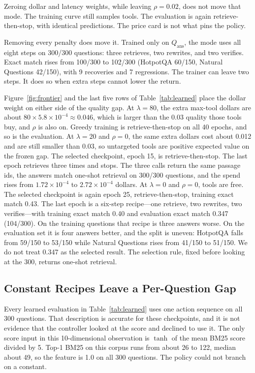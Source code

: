 \documentclass[letterpaper]{article} %
\begin{document}
Zeroing dollar and latency weights, while leaving \(\rho{=}0.02\), does not move that mode. The training curve still samples tools. The evaluation is again retrieve-then-stop, with identical predictions. The price card is not what pins the policy.

Removing every penalty does move it. Trained only on \(Q_{\mathrm{ans}}\), the mode uses all eight steps on 300/300 questions: three retrieves, two rewrites, and two verifies. Exact match rises from 100/300 to 102/300 (HotpotQA 60/150, Natural Questions 42/150), with 9 recoveries and 7 regressions. The trainer can leave two steps. It does so when extra steps cannot lower the return.

Figure~\ref{fig:frontier} and the last five rows of Table~\ref{tab:learned} place the dollar weight on either side of the quality gap. At \(\lambda{=}80\), the extra max-tool dollars are about \(80 \times 5.8\times 10^{-4} \approx 0.046\), which is larger than the 0.03 quality those tools buy, and \(\rho\) is also on. Greedy training is retrieve-then-stop on all 40 epochs, and so is the evaluation. At \(\lambda{=}20\) and \(\rho{=}0\), the same extra dollars cost about 0.012 and are still smaller than 0.03, so untargeted tools are positive expected value on the frozen gap. The selected checkpoint, epoch 15, is retrieve-then-stop. The last epoch retrieves three times and stops. The three calls return the same passage ids, the answers match one-shot retrieval on 300/300 questions, and the spend rises from \(1.72\times 10^{-4}\) to \(2.72\times 10^{-4}\) dollars. At \(\lambda{=}0\) and \(\rho{=}0\), tools are free. The selected checkpoint is again epoch 25, retrieve-then-stop, training exact match 0.43. The last epoch is a six-step recipe---one retrieve, two rewrites, two verifies---with training exact match 0.40 and evaluation exact match 0.347 (104/300). On the training questions that recipe is three answers worse. On the evaluation set it is four answers better, and the split is uneven: HotpotQA falls from 59/150 to 53/150 while Natural Questions rises from 41/150 to 51/150. We do not treat 0.347 as the selected result. The selection rule, fixed before looking at the 300, returns one-shot retrieval.

\subsection{Constant Recipes Leave a Per-Question Gap}
Every learned evaluation in Table~\ref{tab:learned} uses one action sequence on all 300 questions. That description is accurate for these checkpoints, and it is not evidence that the controller looked at the score and declined to use it. The only score input in this 10-dimensional observation is \(\tanh\) of the mean BM25 score divided by 5. Top-1 BM25 on this corpus runs from about 26 to 122, median about 49, so the feature is 1.0 on all 300 questions. The policy could not branch on a constant.
\end{document}
